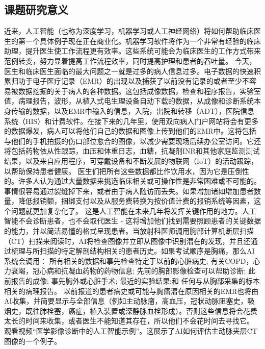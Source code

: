 \subsection{课题研究意义}
近来，人工智能（也称为深度学习，机器学习或人工神经网络）将如何帮助临床医生的第一个具体例子现在正在商业化。机器学习软件将作为一个非常有经验的临床助理，提升医生使工作流程更有效率。这些系统可能会为临床医生的工作方式带来范例转变，努力显着提高工作流程效率，同时提高护理和患者的吞吐量。
今天，医生和临床医生面临的最大问题之一就是过多的病人信息过多。电子数据的快速积累归功于电子医疗记录（EMR）的出现以及捕获了以前没有记录的或者至少不容易被数据挖掘的关于病人的各种数据。这包括成像数据，检查和程序报告，实验室值，病理报告，波形，从植入式电生理设备自动下载的数据，从成像和诊断系统本身传输的数据，以及EMR中输入的信息，入院，出院和转移（ADT），医院信息系统（HIS）和计费软件。在接下来的几年里，使用双向病人门户网站将会有更多的数据爆发，病人可以将他们自己的数据和图像上传到他们的EMR中。这将包括与他们的手机拍摄的伤口部位愈合的图像，以减少需要现场后续办公室访问。它还将包括药物依从性跟踪，血压和体重日志，血糖，抗凝剂INR和其他家庭监测测试结果，以及来自应用程序，可穿戴设备和不断发展的物联网（IoT）的活动跟踪，以帮助保持患者健康。
医生们把所有这些数据都比作饮用水，因为它是压倒性的。许多人认为通过大量数据来挑选临床相关或可操作性是非常困难或不可能的。事情很容易通过裂缝掉下来，或者由于病人随访而丢失。如果增加诸如增加患者数量，降低报销额，捆绑支付以及从服务费转换为按价值计费的报销系统等因素，这个问题就更加复杂化了。
这是人工智能在未来几年将发挥关键作用的地方。人工智能不会诊断患者，也不会取代医生 - 这将增加他们找到需要照顾患者的关键数据的能力，并以简洁易懂的格式呈现患者。当放射科医师调用胸部计算机断层扫描（CT）扫描来阅读时，AI将检查图像并立即从图像中识别潜在的发现，并且还通过梳理与所扫描的特定解剖结构相关的患者历史。如果考试顺序是胸痛，那么AI系统会调用：
所有相关的数据和事先检查特定于以前的心脏病史;
有关COPD，心力衰竭，冠心病和抗凝血药物的药物信息;
先前的胸部影像检查可以帮助诊断;
此前报告的成像;
事先胸外或心脏手术;
最近的实验结果;和
任何与从胸部采集的标本相关的病理报告。
以前报道的患者病史或可能与胸痛潜在原因相关的EMR也将由AI收集，并简要显示与全部信息（例如主动脉瘤，高血压，冠状动脉阻塞史，吸烟史，既往肺栓塞，癌症，植入装置或深静脉血栓形成）。否则这些信息将会花费太长的时间来收集，或者医生不能知道其存在，所以他们不会花时间去寻找它。
观看视频“医学影像诊断中的人工智能示例”。这展示了AI如何评估主动脉夹层CT图像的一个例子。
 

